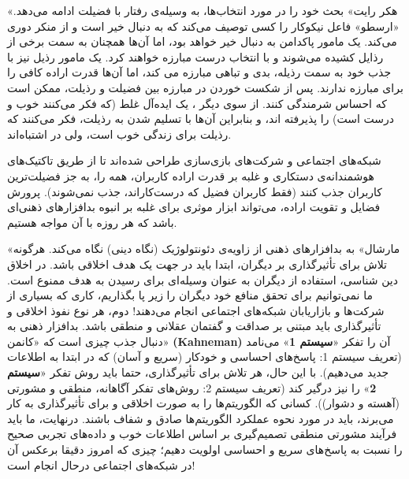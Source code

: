 \documentclass[12pt,oneside]{book}
\begin{document}
    «هکر رایت» بحث خود را در مورد انتخاب‌ها، به وسیله‌ی رفتار با فضیلت ادامه می‌دهد.
    «ارسطو» فاعل نیکوکار را کسی توصیف می‌کند که به دنبال خیر است و از منکر دوری می‌کند.
    یک مامور پاکدامن به دنبال خیر خواهد بود، اما آن‌ها همچنان به سمت برخی از رذایل کشیده می‌شوند و با انتخاب درست مبارزه خواهند کرد.
    یک مامور رذیل نیز با جذب خود به سمت رذیله، بدی و تباهی مبارزه می کند، اما آن‌ها قدرت اراده کافی را برای مبارزه ندارند.
    پس از شکست خوردن در مبارزه بین فضیلت و رذیلت، ممکن است که احساس شرمندگی کنند.
    از سوی دیگر ، یک ایده‌آل غلط (که فکر می‌کنند خوب و درست است) را پذیرفته اند، و بنابراین آن‌ها با تسلیم شدن به رذیلت، فکر می‌کنند که رذیلت برای زندگی خوب است، ولی در اشتباه‌اند.

    شبکه‌های اجتماعی و شرکت‌های بازی‌سازی طراحی شده‌اند تا از طریق تاکتیک‌های هوشمندانه‌ی دستکاری و غلبه بر قدرت اراده کاربران، همه را، به جز فضیلت‌ترین کاربران جذب کنند (فقط کاربران فضیل که درست‌کاراند، جذب نمی‌شوند).
    پرورش فضایل و تقویت اراده، می‌تواند ابزار موثری برای غلبه بر انبوه بدافزارهای ذهنی‌ای باشد که هر روزه با آن مواجه هستیم.

    «مارشال» به بدافزارهای ذهنی از زاویه‌ی دئونتولوژیک (نگاه دینی) نگاه می‌کند.
    هرگونه تلاش برای تأثیرگذاری بر دیگران، ابتدا باید در جهت یک هدف اخلاقی باشد.
    در اخلاق دین شناسی، استفاده از دیگران به عنوان وسیله‌ای برای رسیدن به هدف ممنوع است.
    ما نمی‌توانیم برای تحقق منافع خود دیگران را زیر پا بگذاریم، کاری که بسیاری از شرکت‌ها و بازاریابان شبکه‌های اجتماعی انجام می‌دهند!
    دوم، هر نوع نفوذ اخلاقی و تأثیرگذاری باید مبتنی بر صداقت و گفتمان عقلانی و منطقی باشد.
    بدافزار ذهنی به دنبال جذب چیزی است که «کانمن» \textenglish{\textbf{(Kahneman)}} آن را تفکر «\textbf{سیستم 1}» می‌نامد (تعریف سیستم 1: پاسخ‌های احساسی و خودکار (سریع و آسان) که در ابتدا به اطلاعات جدید می‌دهیم).
    با این حال، هر تلاش برای تأثیرگذاری، حتما باید روش تفکر «\textbf{سیستم 2}» را نیز درگیر کند (تعریف سیستم 2: روش‌های تفکر آگاهانه، منطقی و مشورتی (آهسته و دشوار)).
    کسانی که الگوریتم‌ها را به صورت اخلاقی و برای تأثیرگذاری به کار می‌برند، باید در مورد نحوه عملکرد الگوریتم‌ها صادق و شفاف باشند.
    درنهایت، ما باید فرآیند مشورتی منطقی تصمیم‌گیری بر اساس اطلاعات خوب و داده‌های تجربی صحیح را نسبت به پاسخ‌های سریع و احساسی اولویت دهیم؛ چیزی که امروز دقیقا برعکس آن در شبکه‌های اجتماعی درحال انجام است!
\end{document}

